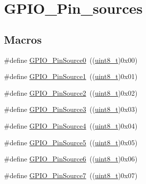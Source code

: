 \hypertarget{group___g_p_i_o___pin__sources}{}\section{G\+P\+I\+O\+\_\+\+Pin\+\_\+sources}
\label{group___g_p_i_o___pin__sources}
\subsection*{Macros}
\begin{DoxyCompactItemize}
\item 
\#define \hyperlink{group___g_p_i_o___pin__sources_ga028bcbdf5a7fd81ec45830f60a022bb4}{G\+P\+I\+O\+\_\+\+Pin\+Source0}~((\hyperlink{_p_e___types_8h_aba7bc1797add20fe3efdf37ced1182c5}{uint8\+\_\+t})0x00)
\item 
\#define \hyperlink{group___g_p_i_o___pin__sources_gad02324cdd8526a7aacd15a5a910d56f1}{G\+P\+I\+O\+\_\+\+Pin\+Source1}~((\hyperlink{_p_e___types_8h_aba7bc1797add20fe3efdf37ced1182c5}{uint8\+\_\+t})0x01)
\item 
\#define \hyperlink{group___g_p_i_o___pin__sources_ga7808fb6269890fa1e37a322418884607}{G\+P\+I\+O\+\_\+\+Pin\+Source2}~((\hyperlink{_p_e___types_8h_aba7bc1797add20fe3efdf37ced1182c5}{uint8\+\_\+t})0x02)
\item 
\#define \hyperlink{group___g_p_i_o___pin__sources_ga0df17fee84ec9ab096b5525a06871863}{G\+P\+I\+O\+\_\+\+Pin\+Source3}~((\hyperlink{_p_e___types_8h_aba7bc1797add20fe3efdf37ced1182c5}{uint8\+\_\+t})0x03)
\item 
\#define \hyperlink{group___g_p_i_o___pin__sources_gaf5aa545455dacbf315a40cecd0842b6c}{G\+P\+I\+O\+\_\+\+Pin\+Source4}~((\hyperlink{_p_e___types_8h_aba7bc1797add20fe3efdf37ced1182c5}{uint8\+\_\+t})0x04)
\item 
\#define \hyperlink{group___g_p_i_o___pin__sources_gaf231e680fe2db4ea44a7fd0f5d5c5875}{G\+P\+I\+O\+\_\+\+Pin\+Source5}~((\hyperlink{_p_e___types_8h_aba7bc1797add20fe3efdf37ced1182c5}{uint8\+\_\+t})0x05)
\item 
\#define \hyperlink{group___g_p_i_o___pin__sources_gada41b6bd03b2873a2400628df0a1026e}{G\+P\+I\+O\+\_\+\+Pin\+Source6}~((\hyperlink{_p_e___types_8h_aba7bc1797add20fe3efdf37ced1182c5}{uint8\+\_\+t})0x06)
\item 
\#define \hyperlink{group___g_p_i_o___pin__sources_ga609974472a3a7c5274fc56018d7adf16}{G\+P\+I\+O\+\_\+\+Pin\+Source7}~((\hyperlink{_p_e___types_8h_aba7bc1797add20fe3efdf37ced1182c5}{uint8\+\_\+t})0x07)

\end{DoxyCompactItemize}
